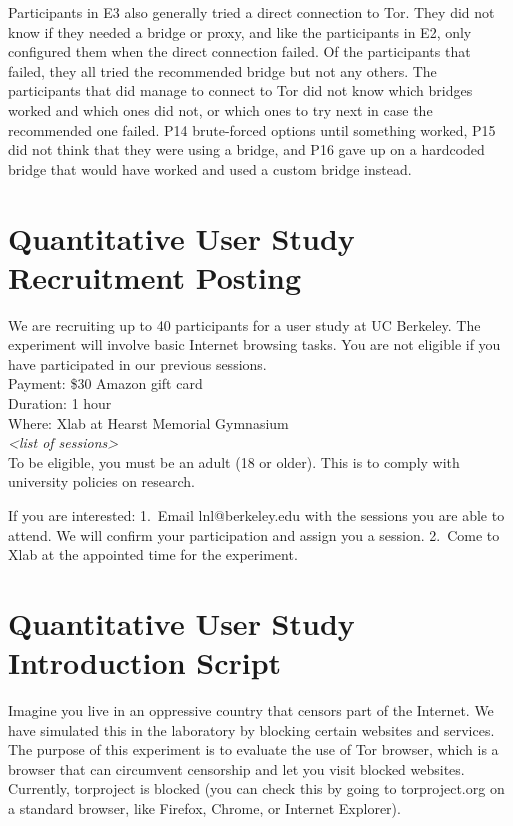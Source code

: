 \documentclass[USenglish,oneside,twocolumn]{article}
\begin{document}
Participants in E3 also generally tried a direct connection to Tor. They did not know if they needed a bridge or proxy, and like the participants in E2, only configured them when the direct connection failed. Of the participants that failed, they all tried the recommended bridge but not any others. The participants that did manage to connect to Tor did not know which bridges worked and which ones did not, or which ones to try next in case the recommended one failed. P14 brute-forced options until something worked, P15 did not think that they were using a bridge, and P16 gave up on a hardcoded bridge that would have worked and used a custom bridge instead.

\section{Quantitative User Study Recruitment Posting}
\label{quantitative-recruitment}
We are recruiting up to 40 participants for a user study at UC Berkeley. 
The experiment will involve basic Internet browsing tasks. You are not eligible if you have participated in our previous sessions.\\

\indent Payment: \$30 Amazon gift card\\
\indent Duration: 1 hour \\
\indent Where: Xlab at Hearst Memorial Gymnasium\\

\textit{<list of sessions>}\\

To be eligible, you must be an adult (18 or older). This is to comply with university policies on research. 

If you are interested: 1.~Email lnl@berkeley.edu 
with the sessions you are able to attend. We will confirm your participation and assign you a session. 
2.~Come to Xlab 
at the appointed time for the experiment.

\section{Quantitative User Study Introduction Script} 
\label{quantitative-script} 
Imagine you live in an oppressive country that censors part of the Internet. We have simulated this in the laboratory by blocking certain websites and services.  The purpose of this experiment is to evaluate the use of Tor browser, which is a browser that can circumvent censorship and let you visit blocked websites. Currently, torproject is blocked (you can check this by going to torproject.org on a standard browser, like Firefox, Chrome, or Internet Explorer). 
\end{document}
